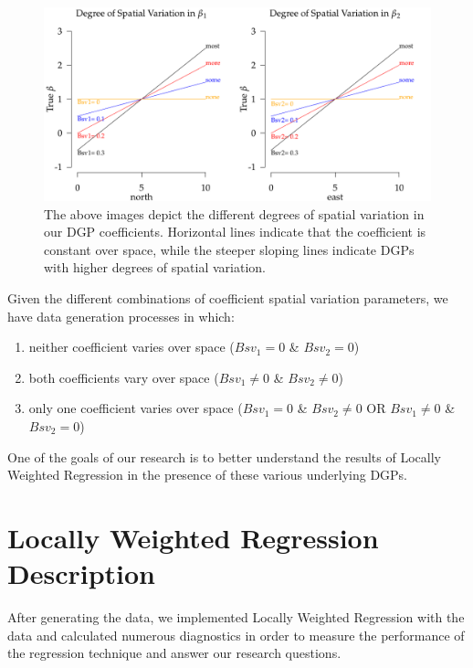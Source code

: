 \documentclass{article}\usepackage{graphicx, color}
\begin{document}
\begin{figure}\label{fig:SpatVarBeta}
\includegraphics[width = \textwidth]{figure/SpatVarBeta.pdf}
\caption{The above images depict the different degrees of spatial variation in our DGP coefficients. Horizontal lines indicate that the coefficient is constant over space, while the steeper sloping lines indicate DGPs with higher degrees of spatial variation.}
\end{figure}
Given the different combinations of coefficient spatial variation parameters, we have data generation processes in which:
\begin{enumerate}
\item neither coefficient varies over space ($Bsv_1 = 0$ \& $Bsv_2 = 0$)
\item both coefficients vary over space ($Bsv_1 \neq 0$ \& $Bsv_2 \neq 0$)
\item only one coefficient varies over space ($Bsv_1 = 0$ \& $Bsv_2 \neq 0$ OR $Bsv_1 \neq 0$ \& $Bsv_2 = 0$)
\end{enumerate}

One of the goals of our research is to better understand the results of Locally Weighted Regression in the presence of these various underlying DGPs. 


\section{Locally Weighted Regression Description}

After generating the data, we implemented Locally Weighted Regression with the data and calculated numerous diagnostics in order to measure the performance of the regression technique and answer our research questions.
\end{document}
